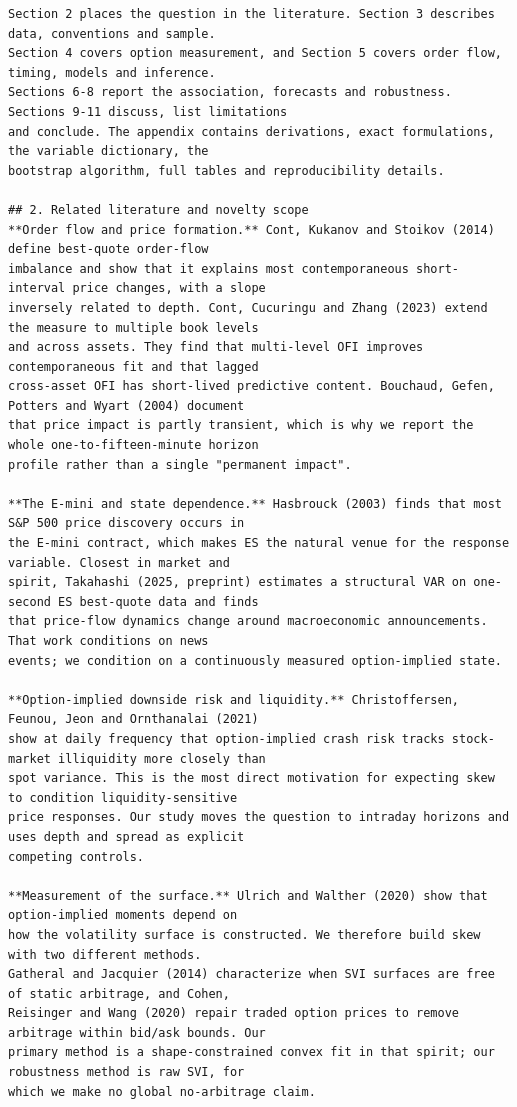 \documentclass[11pt]{article}
\begin{document}
\begin{verbatim}
Section 2 places the question in the literature. Section 3 describes data, conventions and sample.
Section 4 covers option measurement, and Section 5 covers order flow, timing, models and inference.
Sections 6-8 report the association, forecasts and robustness. Sections 9-11 discuss, list limitations
and conclude. The appendix contains derivations, exact formulations, the variable dictionary, the
bootstrap algorithm, full tables and reproducibility details.

## 2. Related literature and novelty scope
**Order flow and price formation.** Cont, Kukanov and Stoikov (2014) define best-quote order-flow
imbalance and show that it explains most contemporaneous short-interval price changes, with a slope
inversely related to depth. Cont, Cucuringu and Zhang (2023) extend the measure to multiple book levels
and across assets. They find that multi-level OFI improves contemporaneous fit and that lagged
cross-asset OFI has short-lived predictive content. Bouchaud, Gefen, Potters and Wyart (2004) document
that price impact is partly transient, which is why we report the whole one-to-fifteen-minute horizon
profile rather than a single "permanent impact".

**The E-mini and state dependence.** Hasbrouck (2003) finds that most S&P 500 price discovery occurs in
the E-mini contract, which makes ES the natural venue for the response variable. Closest in market and
spirit, Takahashi (2025, preprint) estimates a structural VAR on one-second ES best-quote data and finds
that price-flow dynamics change around macroeconomic announcements. That work conditions on news
events; we condition on a continuously measured option-implied state.

**Option-implied downside risk and liquidity.** Christoffersen, Feunou, Jeon and Ornthanalai (2021)
show at daily frequency that option-implied crash risk tracks stock-market illiquidity more closely than
spot variance. This is the most direct motivation for expecting skew to condition liquidity-sensitive
price responses. Our study moves the question to intraday horizons and uses depth and spread as explicit
competing controls.

**Measurement of the surface.** Ulrich and Walther (2020) show that option-implied moments depend on
how the volatility surface is constructed. We therefore build skew with two different methods.
Gatheral and Jacquier (2014) characterize when SVI surfaces are free of static arbitrage, and Cohen,
Reisinger and Wang (2020) repair traded option prices to remove arbitrage within bid/ask bounds. Our
primary method is a shape-constrained convex fit in that spirit; our robustness method is raw SVI, for
which we make no global no-arbitrage claim.


\end{verbatim}
\end{document}
